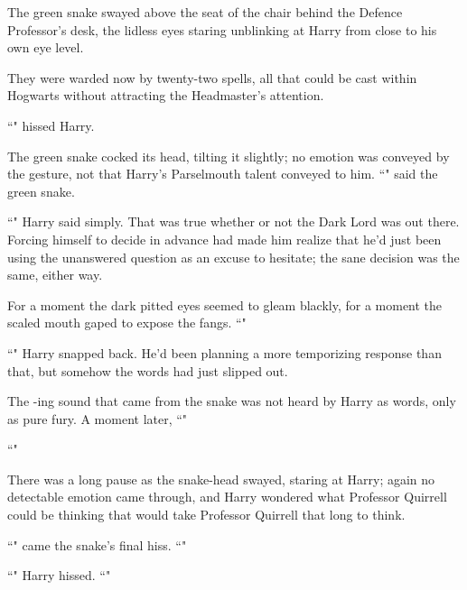 The green snake swayed above the seat of the chair behind the Defence Professor's desk, the lidless eyes staring unblinking at Harry from close to his own eye level.

They were warded now by twenty-two spells, all that could be cast within Hogwarts without attracting the Headmaster's attention.

``" hissed Harry.

The green snake cocked its head, tilting it slightly; no emotion was conveyed by the gesture, not that Harry's Parselmouth talent conveyed to him. ``" said the green snake.

``" Harry said simply. That was true whether or not the Dark Lord was out there. Forcing himself to decide in advance had made him realize that he'd just been using the unanswered question as an excuse to hesitate; the sane decision was the same, either way.

For a moment the dark pitted eyes seemed to gleam blackly, for a moment the scaled mouth gaped to expose the fangs. ``"

``" Harry snapped back. He'd been planning a more temporizing response than that, but somehow the words had just slipped out.

The -ing sound that came from the snake was not heard by Harry as words, only as pure fury. A moment later, ``"

``"

There was a long pause as the snake-head swayed, staring at Harry; again no detectable emotion came through, and Harry wondered what Professor Quirrell could be thinking that would take Professor Quirrell that long to think.

``" came the snake's final hiss. ``"

``" Harry hissed. ``"

